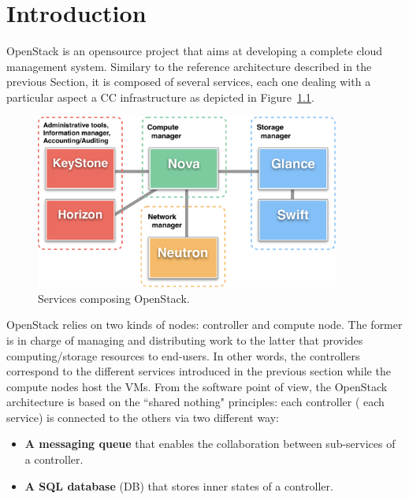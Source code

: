 \chapter{Introduction}
\label{sec:intro}

OpenStack is an opensource project that aims at developing a complete cloud
management system. Similary to the reference architecture described in the
previous Section, it is composed of several services, each one dealing with a
particular aspect a CC infrastructure as depicted in Figure~\ref{fig:openstack}.

\begin{figure}[htbp]
        \centering
        \includegraphics[width=10cm]{figures/OpenStack_architecture.pdf}
        \caption{Services composing OpenStack.}
        \label{fig:openstack}
\vspace*{-.3cm}
\end{figure}


OpenStack relies on two kinds of nodes: controller and compute node. The former
is in charge of managing and distributing work to the latter that provides
computing/storage resources to end-users. In other words, the controllers
correspond to the different services introduced in the previous section while
the compute nodes host the VMs. From the software point of view, the OpenStack
architecture is based on the ``shared nothing" principles: each controller (\ie
each service) is connected to the others via two different way:

\begin{itemize}
   \setlength{\itemsep}{0pt}
  \setlength{\parskip}{0pt}
   \setlength{\parsep}{0pt}
\item \textbf{A messaging queue} that enables the collaboration between sub-services of a
  controller.
\item \textbf{A SQL database} (DB) that stores inner states of a controller.
\end{itemize}

